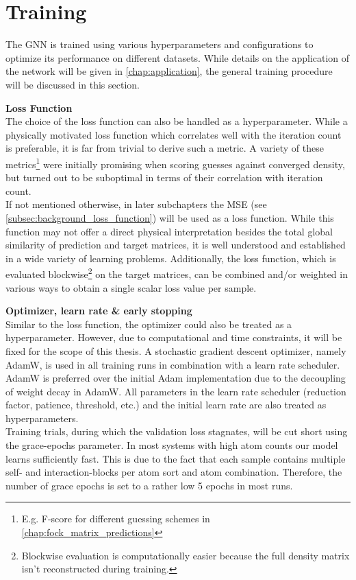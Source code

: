 \section{Training}
\label{sec:gnn_training}
The GNN is trained using various hyperparameters and configurations to optimize its performance on different datasets. While details on the application of the network will be given in \autoref{chap:application}, the general training procedure will be discussed in this section.

\textbf{Loss Function}\\
The choice of the loss function can also be handled as a hyperparameter. While a physically motivated loss function which correlates well with the iteration count is preferable, it is far from trivial to derive such a metric. A variety of these metrics\footnote{E.g. F-score for different guessing schemes in \autoref{chap:fock_matrix_predictions}} were initially promising when scoring guesses against converged density, but turned out to be suboptimal in terms of their correlation with iteration count. \\
If not mentioned otherwise, in later subchapters the MSE (see \autoref{subsec:background_loss_function}) will be used as a loss function. While this function may not offer a direct physical interpretation besides the total global similarity of prediction and target matrices, it is well understood and established in a wide variety of learning problems. Additionally, the loss function, which is evaluated blockwise\footnote{Blockwise evaluation is computationally easier because the full density matrix isn't reconstructed during training.} on the target matrices, can be combined and/or weighted in various ways to obtain a single scalar loss value per sample. 

\textbf{Optimizer, learn rate \& early stopping}\\
Similar to the loss function, the optimizer could also be treated as a hyperparameter. However, due to computational and time constraints, it will be fixed for the scope of this thesis. A stochastic gradient descent optimizer, namely AdamW, is used in all training runs in combination with a learn rate scheduler. AdamW is preferred over the initial Adam implementation due to the decoupling of weight decay in AdamW. \parencite{ref:adamW} All parameters in the learn rate scheduler (reduction factor, patience, threshold, etc.) and the initial learn rate are also treated as hyperparameters. \\
Training trials, during which the validation loss stagnates, will be cut short using the grace-epochs parameter. In most systems with high atom counts our model learns sufficiently fast. This is due to the fact that each sample contains multiple self- and interaction-blocks per atom sort and atom combination. Therefore, the number of grace epochs is set to a rather low 5 epochs in most runs. 

